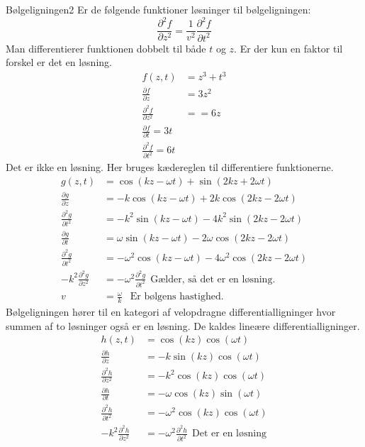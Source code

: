 \begin{opgave}{Bølgeligningen}{2}
Er de følgende funktioner løsninger til bølgeligningen: 
$$
\frac{\partial^2f}{\partial z^2} = \frac{1}{v^2}\frac{\partial^2 f}{\partial t^2}
$$
Man differentierer funktionen dobbelt til både $t$ og $z$. Er der kun en faktor til forskel er det en løsning.
\opg 
\begin{align*}
f(z,t) &= z^3+t^3\\
\frac{\partial f}{\partial z} &= 3z^2\\
\frac{\partial^2 f}{\partial z^2} &== 6z\\
\frac{\partial f}{\partial t} = 3t\\
\frac{\partial^2 f}{\partial t^2} = 6t
\end{align*}
Det er ikke en løsning.
\opg Her bruges kædereglen til differentiere funktionerne.
\begin{align*}
g(z,t) &=\cos(kz-\omega t)+\sin(2kz+2\omega t)\\
\frac{\partial g}{\partial z} &= -k\cos(kz-\omega t)+2k\cos(2kz-2\omega t)\\
\frac{\partial^2 g}{\partial t^2} &=-k^2\sin(kz-\omega t)-4k^2\sin(2kz-2\omega t)\\
\frac{\partial g}{\partial t} &= \omega\sin(kz-\omega t) -2\omega \cos(2kz-2\omega t)\\
\frac{\partial^2 g}{\partial t^2} &= -\omega^2\cos(kz-\omega t) - 4\omega^2\cos(2kz-2\omega t)\\
-k^2\frac{\partial^2 g}{\partial z^2} &= -\omega^2 \frac{\partial^2 g}{\partial t^2}~~\text{Gælder, så det er en løsning.}\\
v&=\frac{\omega}{k}~~\text{~Er bølgens hastighed.} 
\end{align*}
Bølgeligningen hører til en kategori af velopdragne differentialligninger hvor summen af to løsninger også er en løsning. De kaldes lineære differentialligninger.
\opg
\begin{align*}
h(z,t) &= \cos(kz)\cos(\omega t)\\
\frac{\partial h}{\partial z} &= -k\sin(kz)\cos(\omega t)\\
\frac{\partial^2 h}{\partial z^2} &= -k^2\cos(kz)\cos(\omega t)\\
\frac{\partial h}{\partial t} &= -\omega \cos(kz)\sin(\omega t)\\
\frac{\partial^2 h}{\partial t^2} &= -\omega^2 \cos(kz)\cos(\omega t)\\
-k^2\frac{\partial^2 h}{\partial z^2} &= -\omega^2\frac{\partial^2 h}{\partial t^2}~~\text{Det er en løsning}\\

\end{align*}
\end{opgave}
